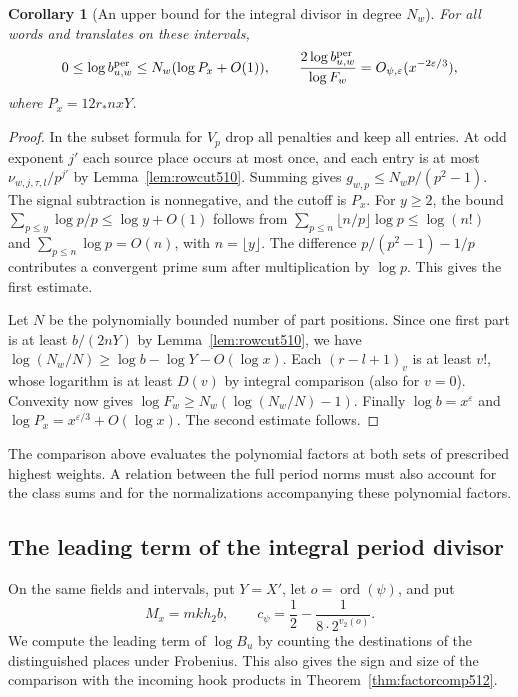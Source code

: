 \documentclass[a4paper,11pt]{article}
\newtheorem{corollary}[proposition]{Corollary}
\theoremstyle{definition}
\theoremstyle{remark}
\numberwithin{equation}{section}
\begin{document}
\begin{corollary}[An upper bound for the integral divisor in degree \(N_w\)]\leavevmode
\label{cor:degreebound512}
For all words and translates on these intervals,
\[
  0\le\log b^{\rm per}_{u,w}\le N_w(\log P_x+O(1)),
  \qquad
  \frac{2\log b^{\rm per}_{u,w}}{\log F_w}
                  =O_{\psi,\varepsilon}(x^{-2\varepsilon/3}),
\]
where \(P_x=12r_*nxY\).
\end{corollary}
\begin{proof}
In the subset formula for \(V_p\) drop all penalties and keep
all entries. At odd exponent \(j'\) each source place occurs
at most once, and each entry is at most
\(\nu_{w,j,\tau,l}/p^{j'}\) by Lemma~\ref{lem:rowcut510}.
Summing gives \(g_{w,p}\le N_w p/(p^2-1)\). The signal
subtraction is nonnegative, and the cutoff is \(P_x\).
For \(y\ge2\), the bound \(\sum_{p\le y}\log p/p\le\log y+O(1)\)
follows from \(\sum_{p\le n}\lfloor n/p\rfloor\log p\le\log(n!)\)
and \(\sum_{p\le n}\log p=O(n)\), with \(n=\lfloor y\rfloor\).
The difference \(p/(p^2-1)-1/p\) contributes a convergent
prime sum after multiplication by \(\log p\). This gives the
first estimate.

Let \(N\) be the polynomially bounded number of part positions.
Since one first part is at least \(b/(2nY)\) by
Lemma~\ref{lem:rowcut510}, we have
\(\log(N_w/N)\ge\log b-\log Y-O(\log x)\).
Each \((r-l+1)_v\) is at least \(v!\), whose logarithm is at
least \(D(v)\) by integral comparison (also for \(v=0\)).
Convexity now gives
\(\log F_w\ge N_w(\log(N_w/N)-1)\). Finally
\(\log b=x^\varepsilon\) and
\(\log P_x=x^{\varepsilon/3}+O(\log x)\). The second estimate
follows.
\end{proof}

The comparison above evaluates the polynomial factors at both
sets of prescribed highest weights. A relation between the full
period norms must also account for the class sums and for the
normalizations accompanying these polynomial factors.


\subsection{The leading term of the integral period divisor}
\label{sec:divconstant513}

On the same fields and intervals, put \(Y=X'\), let
\(o=\operatorname{ord}(\psi)\), and put
\[
             M_x=m k h_2 b,\qquad
             c_\psi=\frac12-\frac{1}{8\cdot 2^{v_2(o)}} .
\]
We compute the leading term of \(\log B_u\) by counting the
destinations of the distinguished places under Frobenius. This
also gives the sign and size of the comparison with the incoming
hook products in Theorem~\ref{thm:factorcomp512}.
\end{document}
